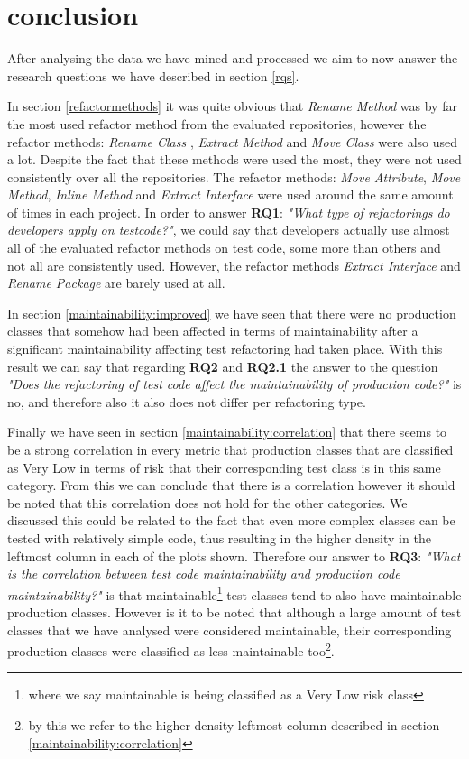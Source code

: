 \section{conclusion}
After analysing the data we have mined and processed we aim to now answer the research questions we have described in section \ref{rqs}.

In section \ref{refactormethods} it was quite obvious that \textit{Rename Method} was by far the most used refactor method from the evaluated repositories, however the refactor methods: \textit{Rename Class} , \textit{Extract Method} and \textit{Move Class} were also used a lot. Despite the fact that these methods were used the most, they were not used consistently over all the repositories. The refactor methods: \textit{Move Attribute}, \textit{Move Method}, \textit{Inline Method} and \textit{Extract Interface} were used around the same amount of times in each project. In order to answer \textbf{RQ1}: \textit{"What type of refactorings do developers apply on testcode?"}, we could say that developers actually use almost all of the evaluated refactor methods on test code, some more than others and not all are consistently used. However, the refactor methods \textit{Extract Interface} and \textit{Rename Package} are barely used at all.

In section \ref{maintainability:improved} we have seen that there were no production classes that somehow had been affected in terms of maintainability after a significant maintainability affecting test refactoring had taken place. With this result we can say that regarding \textbf{RQ2} and \textbf{RQ2.1} the answer to the question \textit{"Does the refactoring of test code affect the maintainability of production code?"} is no, and therefore also it also does not differ per refactoring type.

Finally we have seen in section \ref{maintainability:correlation} that there seems to be a strong correlation in every metric that production classes that are classified as Very Low in terms of risk that their corresponding test class is in this same category. From this we can conclude that there is a correlation however it should be noted that this correlation does not hold for the other categories. We discussed this could be related to the fact that even more complex classes can be tested with relatively simple code, thus resulting in the higher density in the leftmost column in each of the plots shown. Therefore our answer to \textbf{RQ3}: \textit{"What is the correlation between test code maintainability and production code maintainability?"} is that maintainable\footnote{where we say maintainable is being classified as a Very Low risk class} test classes tend to also have maintainable production classes. However is it to be noted that although a large amount of test classes that we have analysed were considered maintainable, their corresponding production classes were classified as less maintainable too\footnote{by this we refer to the higher density leftmost column described in section \ref{maintainability:correlation}}.